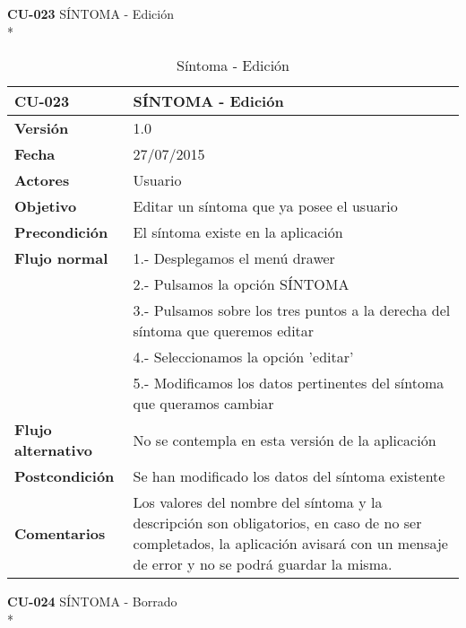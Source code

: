 \documentclass[../pfc.tex]{subfiles}
\begin{document}
	\textbf{CU-023}	SÍNTOMA - Edición\\*
	
	\begin{table}[H]
		\centering
		\begin{tabular}[t]{|p{3cm}|p{9.5cm}|}
			\hline \textbf{CU-023} & \textbf{SÍNTOMA - Edición} \\*
			\hline\hline \textbf{Versión} & 1.0 \\*
			\hline\hline \textbf{Fecha} & 27/07/2015 \\*
			\hline\textbf{Actores} 	& Usuario\\*
			\hline \textbf{Objetivo} & Editar un síntoma que ya posee el usuario\\* 			
			\hline \textbf{Precondición} & El síntoma existe en la aplicación\\* 
			\hline \textbf{Flujo normal} & 1.- Desplegamos el menú drawer \\* 
			& 2.- Pulsamos la opción SÍNTOMA\\*	
			& 3.- Pulsamos sobre los tres puntos a la derecha del síntoma que queremos editar\\*	
			& 4.- Seleccionamos la opción 'editar'\\*	
			& 5.- Modificamos los datos pertinentes del síntoma que queramos cambiar\\*	
			\hline \textbf{Flujo alternativo} & No se contempla en esta versión de la aplicación\\*
			\hline \textbf{Postcondición} & Se han modificado los datos del síntoma existente\\* 
			\hline \textbf{Comentarios}   & Los valores del nombre del síntoma y la descripción son obligatorios, en caso de no ser completados, la aplicación avisará con un mensaje de error y no se podrá guardar la misma.\\*
			\hline
		\end{tabular}
		\caption{Síntoma - Edición}
		\label{tabla:caso023}
	\end{table}
	
	\clearpage
	
	\textbf{CU-024}	SÍNTOMA - Borrado\\*
	
\end{document}
